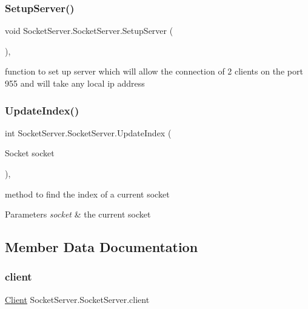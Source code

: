 \subsubsection{\texorpdfstring{Setup\+Server()}{SetupServer()}}
{\footnotesize\ttfamily void Socket\+Server.\+Socket\+Server.\+Setup\+Server (\begin{DoxyParamCaption}{ }\end{DoxyParamCaption})\hspace{0.3cm}{\ttfamily [inline]}, {\ttfamily [private]}}

function to set up server which will allow the connection of 2 clients on the port 955 and will take any local ip address \mbox{\label{class_socket_server_1_1_socket_server_a927514acb2fcf8804b360ad07b677a53}} 
\subsubsection{\texorpdfstring{Update\+Index()}{UpdateIndex()}}
{\footnotesize\ttfamily int Socket\+Server.\+Socket\+Server.\+Update\+Index (\begin{DoxyParamCaption}\item[{Socket}]{socket }\end{DoxyParamCaption})\hspace{0.3cm}{\ttfamily [inline]}, {\ttfamily [private]}}

method to find the index of a current socket 
\begin{DoxyParams}{Parameters}
{\em socket} & the current socket \\
\hline
\end{DoxyParams}


\subsection{Member Data Documentation}
\mbox{\label{class_socket_server_1_1_socket_server_a2c56e560fbab349d4ed56524f1f52f9c}} 
\subsubsection{\texorpdfstring{client}{client}}
{\footnotesize\ttfamily \hyperlink{class_socket_server_1_1_client}{Client} Socket\+Server.\+Socket\+Server.\+client\hspace{0.3cm}{\ttfamily [private]}}



